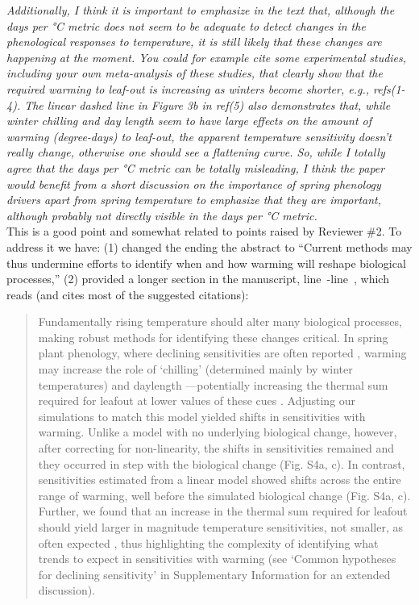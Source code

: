 \documentclass[11pt]{article}
\newcommand{\lr}[1]{line~\lineref{#1}}
\begin{document}
\emph{Additionally, I think it is important to emphasize in the text that, although the days per °C metric does not seem to be adequate to detect changes in the phenological responses to temperature, it is still likely that these changes are happening at the moment. You could for example cite some experimental studies, including your own meta-analysis of these studies, that clearly show that the required warming to leaf-out is increasing as winters become shorter, e.g., refs(1-4). The linear dashed line in Figure 3b in ref(5) also demonstrates that, while winter chilling and day length seem to have large effects on the amount of warming (degree-days) to leaf-out, the apparent temperature sensitivity doesn't really change, otherwise one should see a flattening curve. So, while I totally agree that the days per °C metric can be totally misleading, I think the paper would benefit from a short discussion on the importance of spring phenology drivers apart from spring temperature to
emphasize that they are important, although probably not directly visible in the days per °C metric.}\\

This is a good point and somewhat related to points raised by Reviewer \#2. To address it we have: (1) changed the ending the abstract to ``Current methods may thus undermine efforts to identify when and how warming will reshape biological processes,'' (2) provided a longer section in the manuscript, \lr{biomattersstart}-\lr{biomattersend}, which reads (and cites most of the suggested citations):

\begin{quote}
Fundamentally rising temperature should alter many biological processes, making robust methods for identifying these changes critical. In spring plant phenology, where declining sensitivities are often reported \citep{fu2015,piao2017,dai2019ag}, warming may increase the role of `chilling' (determined mainly by winter temperatures) and daylength \citep{Laube:2014a,zohner2016}---potentially increasing the thermal sum required for leafout at lower values of these cues \citep{Polgar2014,zohner2017,flynn2018}. Adjusting our simulations to match this model yielded shifts in sensitivities with warming. Unlike a model with no underlying biological change, however, after correcting for non-linearity, the shifts in sensitivities remained and they occurred in step with the biological change (Fig. S4a, c). In contrast, sensitivities estimated from a linear model showed shifts across the entire range of warming, well before the simulated biological change (Fig. S4a, c). Further, we found that an increase in the thermal sum required for leafout should yield larger in magnitude temperature sensitivities, not smaller, as often expected \citep[e.g.,][]{fu2015}, thus highlighting the complexity of identifying what trends to expect in sensitivities with warming (see `Common hypotheses for declining sensitivity' in Supplementary Information for an extended discussion).
\end{quote}
\end{document}
